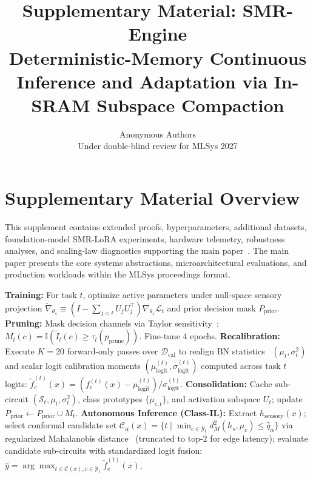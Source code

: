 \documentclass{article}
\title{\textbf{Supplementary Material: SMR-Engine}\\[0.3em]
\Large Deterministic-Memory Continuous Inference and Adaptation via In-SRAM Subspace Compaction}
\author{Anonymous Authors \\
Under double-blind review for MLSys 2027
}
\date{}
\begin{document}
\maketitle
\thispagestyle{fancy}
\setcounter{page}{1}

\section*{Supplementary Material Overview}
This supplement contains extended proofs, hyperparameters, additional datasets, foundation-model SMR-LoRA experiments, hardware telemetry, robustness analyses, and scaling-law diagnostics supporting the main paper~\cite{mccloskey1989catastrophic, French1999, abraham2005memory, zenke2017continual}. The main paper presents the core systems abstractions, microarchitectural evaluations, and production workloads within the MLSys proceedings format.

\begin{algorithm}[!htbp]
\caption{Sparse Mechanistic Routing (SMR) with Conformal Autonomous Routing}
\label{alg:smr}
\label{alg:smr_supp}
\small
\begin{algorithmic}[1]
\STATE \textbf{Training:} For task $t$, optimize active parameters under null-space sensory projection $\tilde{\nabla}_{\theta_s} \equiv (I - \sum_{j<t} U_j U_j^\top)\nabla_{\theta_s} \mathcal{L}_t$ and prior decision mask $P_{\mathrm{prior}}$.
\STATE \textbf{Pruning:} Mask decision channels via Taylor sensitivity~\cite{li2016pruning,molchanov2019importance}: $M_l(c) = \mathbb{I}(\tilde{I}_l(c) \ge \tau_l(p_{\mathrm{prune}}))$. Fine-tune 4 epochs.
\STATE \textbf{Recalibration:} Execute $K=20$ forward-only passes over $\mathcal{D}_{\mathrm{cal}}$ to realign BN statistics~\cite{ioffe2015batch, nahshan2021lossless, hubara2021improving} $(\mu_t, \sigma_t^2)$ and scalar logit calibration moments $(\mu_{\mathrm{logit}}^{(t)}, \sigma_{\mathrm{logit}}^{(t)})$ computed across task $t$ logits: $\tilde{f}_c^{(t)}(x) = (f_c^{(t)}(x) - \mu_{\mathrm{logit}}^{(t)}) / \sigma_{\mathrm{logit}}^{(t)}$.
\STATE \textbf{Consolidation:} Cache sub-circuit $(\mathcal{S}_t, \mu_t, \sigma_t^2)$, class prototypes $\{\mu_{c,t}\}$, and activation subspace $U_t$; update $P_{\mathrm{prior}} \leftarrow P_{\mathrm{prior}} \cup M_t$.
\STATE \textbf{Autonomous Inference (Class-IL):} Extract $h_{\mathrm{sensory}}(x)$; select conformal candidate set $\mathcal{C}_\alpha(x) = \{t \mid \min_{c \in \mathcal{Y}_t} d_M^2(h_s, \mu_c) \le \hat{q}_\alpha\}$ via regularized Mahalanobis distance~\cite{lee2018simple} (truncated to top-2 for edge latency); evaluate candidate sub-circuits with standardized logit fusion: $\hat{y} = \arg\max_{t \in \mathcal{C}(x), c \in \mathcal{Y}_t} \tilde{f}_c^{(t)}(x)$.
\end{algorithmic}
\end{algorithm}
\end{document}

